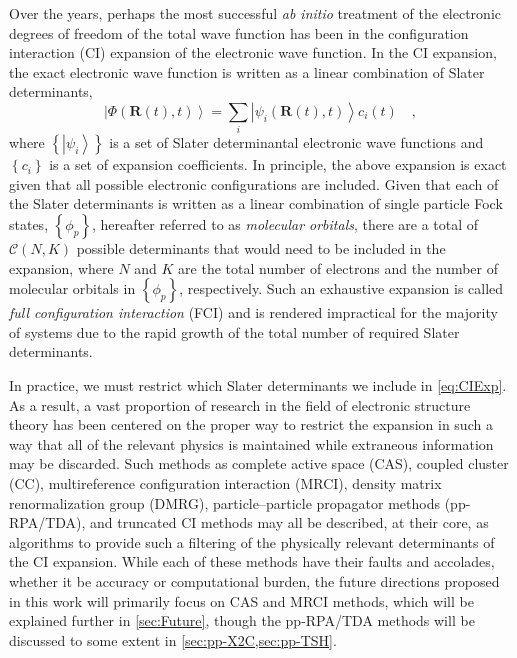 \documentclass[12pt]{article}
\newcommand{\ket}[1]{\left\vert #1 \right\rangle}         %
\newcommand*\vc[1]{\boldsymbol{#1}}
\begin{document}
Over the years, perhaps the most successful \emph{ab initio} treatment of the
electronic degrees of freedom of the total wave function has been in the
configuration interaction (CI) expansion of the electronic wave function. In the
CI expansion, the exact electronic wave function is written as a linear
combination of Slater determinants,
\begin{equation}
\ket{\Phi (\vc{R}(t),t)} = \sum_i  \ket{\psi_i (\vc{R}(t),t)} c_i(t)
\quad ,
\label{eq:CIExp}
\end{equation}
where $\left\lbrace\ket{\psi_i}\right\rbrace$ is a set of Slater determinantal
electronic wave functions and $\left\lbrace c_i \right\rbrace$ is a set of
expansion coefficients.  In principle, the above expansion is exact given that
all possible electronic configurations are included. Given that each of the
Slater determinants is written as a linear combination of single particle Fock
states, $\left\lbrace \phi_p \right\rbrace$, hereafter referred to as
\emph{molecular orbitals}, there are a total of $\mathcal{C}(N,K)$ possible
determinants that would need to be included in the expansion, where $N$ and $K$
are the total number of electrons and the number of molecular orbitals in
$\left\lbrace \phi_p \right\rbrace$, respectively. Such an exhaustive expansion
is called \emph{full configuration interaction} (FCI) and is rendered
impractical for the majority of systems due to the rapid growth of the total
number of required Slater determinants.

In practice, we  must restrict which Slater determinants we include in
\cref{eq:CIExp}. As a result, a vast proportion of research in the field of
electronic structure theory has been centered on the proper way to restrict the
expansion in such a way that all of the relevant physics is maintained while
extraneous information may be discarded. Such methods as complete active space
(CAS), coupled cluster (CC), multireference configuration interaction (MRCI),
density matrix renormalization group (DMRG), particle--particle propagator
methods (pp-RPA/TDA), and truncated CI methods may all be described, at their
core, as algorithms to provide such a filtering of the physically relevant
determinants of the CI expansion. While each of these methods have their faults
and accolades, whether it be accuracy or computational burden, the future
directions proposed in this work will primarily focus on CAS and MRCI methods,
which will be explained further in \cref{sec:Future}, though the pp-RPA/TDA
methods will be discussed to some extent in \cref{sec:pp-X2C,sec:pp-TSH}.
\end{document}
